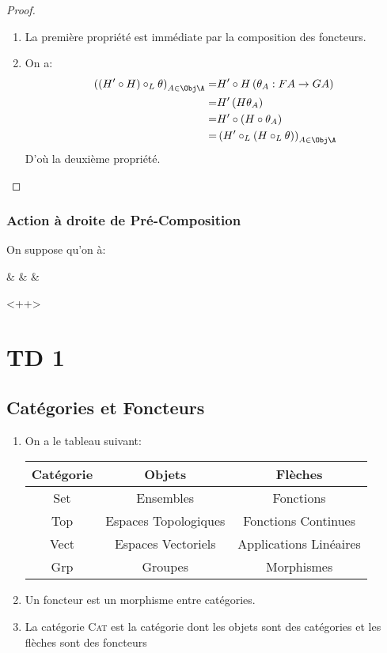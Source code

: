 \documentclass[math]{cours}
\begin{document}
\begin{proof}
	\begin{enumerate}
		\item La première propriété est immédiate par la composition des foncteurs.
		\item On a:
			\begin{equation*}
				\begin{aligned}
					\left( \left( H'\circ H \right) \circ_{L} \theta \right)_{A\in \Obj\A} =& H'\circ H\left(\theta_{A}: FA\to GA\right)\\
					=& H'\left(H\theta_{A}\right)\\
					=& H'\circ \left(H\circ \theta_{A}\right)\\
					=& \left( H'\circ_{L}\left( H \circ_{L} \theta \right) \right)_{A\in \Obj\A}
				\end{aligned}
			\end{equation*}
			D'où la deuxième propriété.
	\end{enumerate}
\end{proof}

\subsubsection{Action à droite de Pré-Composition}
On suppose qu'on à:
\begin{category}
	\A\arrow[r, "H"] & \B\arrow[bend left, rr, "G" name=U]\arrow[bend right, rr, "F"{swap, name=D}] & & \cont{}
\end{category}<++>


\section{TD 1}
\subsection{Catégories et Foncteurs}
\begin{enumerate}
	\item On a le tableau suivant:
		\begin{tabular}{>{\sc}ccc}
			\bf Catégorie & \bf Objets &\bf Flèches\\
			\midrule
			Set & Ensembles & Fonctions\\
			Top & Espaces Topologiques & Fonctions Continues\\
			Vect & Espaces Vectoriels & Applications Linéaires\\
			Grp & Groupes & Morphismes
		\end{tabular}
	\item Un foncteur est un morphisme entre catégories.
	\item La catégorie \textsc{Cat} est la catégorie dont les objets sont des catégories et les flèches sont des foncteurs
\end{enumerate}
\end{document}
